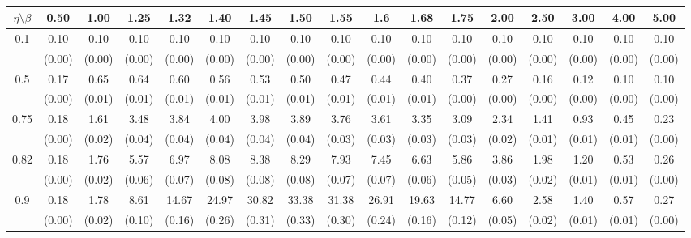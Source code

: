 \documentclass[12pt]{article}  %
\theoremstyle{plain}
\begin{document}
\begin{sidewaystable}[htbp]
\centering
{} 
\label{ATS_10-7}
\ \\
\begin{tabular}{ccccccccccccccccc}
\hline
$\eta \setminus \beta $        & 0.50   & 1.00   & 1.25   & 1.32   & 1.40   & 1.45   & 1.50   & 1.55   & 1.6   & 1.68   & 1.75   & 2.00   & 2.50   & 3.00   & 4.00  &5.00 \\ \hline
\multirow{2}{*}{0.1}  & 0.10& 0.10& 0.10 & 0.10 & 0.10 &  0.10  & 0.10  & 0.10  & 0.10 & 0.10 & 0.10 & 0.10 & 0.10 & 0.10 & 0.10 & 0.10\\
                      & (0.00) & (0.00) & (0.00) & (0.00) & (0.00) & (0.00) & (0.00) & (0.00) & (0.00) & (0.00) & (0.00) & (0.00) & (0.00) & (0.00) & (0.00) & (0.00)\\ \hline
\multirow{2}{*}{0.5}  &0.17& 0.65 &0.64 & 0.60 & 0.56  & 0.53  & 0.50 &  0.47  & 0.44 & 0.40 & 0.37 & 0.27 & 0.16  & 0.12 & 0.10 & 0.10 \\
                      & (0.00) & (0.01) & (0.01) & (0.01) & (0.01) & (0.01) & (0.01) & (0.01) & (0.01) & (0.01) & (0.00) & (0.00)  & (0.00) & (0.00) & (0.00)&(0.00)\\ \hline
\multirow{2}{*}{0.75}  & 0.18 &1.61& 3.48 & 3.84 & 4.00  & 3.98  & 3.89 &  3.76 &  3.61 & 3.35 & 3.09 & 2.34 & 1.41 &  0.93 & 0.45 & 0.23\\
                      & (0.00)& (0.02)& (0.04)& (0.04)& (0.04)& (0.04)& (0.04)& (0.03)& (0.03)&  (0.03)&  (0.03)&  (0.02)&  (0.01)&  (0.01)&  (0.01) & (0.00)\\ \hline
\multirow{2}{*}{0.82}  &0.18 &1.76 &5.57  &6.97 & 8.08 &  8.38  & 8.29 &  7.93  & 7.45 & 6.63 & 5.86 & 3.86 & 1.98 & 1.20 & 0.53 & 0.26\\
                      & (0.00)& (0.02)& (0.06)& (0.07)& (0.08)& (0.08)& (0.08)& (0.07)& (0.07)&  (0.06)&  (0.05)&  (0.03)&  (0.02)&  (0.01)&  (0.01)& (0.00)\\ \hline
\multirow{2}{*}{0.9}  & 0.18& 1.78& 8.61& 14.67 &24.97 & 30.82 & 33.38 & 31.38 & 26.91& 19.63& 14.77 & 6.60&  2.58 & 1.40 & 0.57 & 0.27\\
                      & (0.00)& (0.02)& (0.10)& (0.16)& (0.26)& (0.31)& (0.33)& (0.30)& (0.24)&  (0.16)&  (0.12)&  (0.05)&  (0.02)&  (0.01)&  (0.01)& (0.00)\\ \hline                                               

\end{tabular}
\end{sidewaystable}
\end{document}
